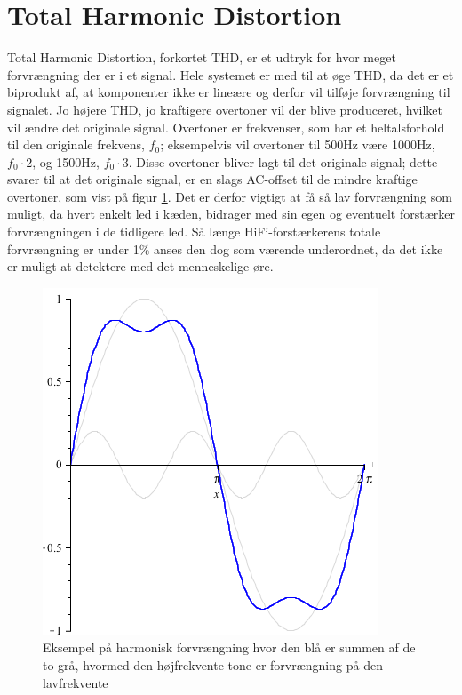 \section{Total Harmonic Distortion}
\label{thd}
Total Harmonic Distortion, forkortet THD, er et udtryk for hvor meget forvrængning der er i et signal.  Hele systemet er med til at øge THD, da det er et biprodukt af, at komponenter ikke er lineære og derfor vil tilføje forvrængning til signalet. Jo højere THD, jo kraftigere overtoner vil der blive produceret, hvilket vil ændre det originale signal. Overtoner er frekvenser, som har et heltalsforhold til den originale frekvens, $f_0$; eksempelvis vil overtoner til 500Hz være 1000Hz, $f_0\cdot2$, og 1500Hz, $f_0\cdot3$. Disse overtoner bliver lagt til det originale signal; dette svarer til at det originale signal, er en slags AC-offset til de mindre kraftige overtoner, som vist på figur \ref{fig:harmonic_distortion}. Det er derfor vigtigt at få så lav forvrængning som muligt, da hvert enkelt led i kæden, bidrager med sin egen og eventuelt forstærker forvrængningen i de tidligere led. Så længe HiFi-forstærkerens totale forvrængning er under 1\% anses den dog som værende underordnet, da det ikke er muligt at detektere med det menneskelige øre.

\begin{figure}[h]
\centering
\includegraphics[scale=.4]{valg_af_loesning/thd/thdsamlet.png}
\caption{Eksempel på harmonisk forvrængning hvor den blå er summen af de to grå, hvormed den højfrekvente tone er forvrængning på den lavfrekvente}
\label{fig:harmonic_distortion}
\end{figure}
